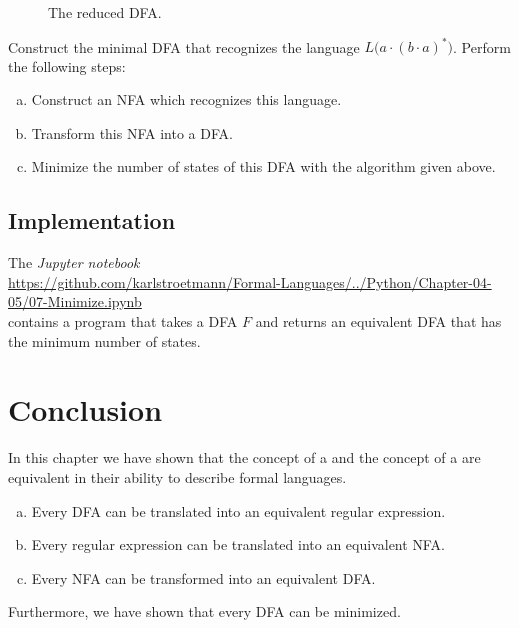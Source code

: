 \begin{figure}[!ht]
  \centering
   \caption{The reduced \textsc{DFA}.}
  \label{fig:gleichwertig.dot}
\end{figure}



\exerciseEng
Construct the minimal  \textsc{DFA} that recognizes the language 
$L\bigl(a \cdot (b \cdot a)^*\bigr)$.  Perform the following steps:
\begin{enumerate}[(a)]
\item Construct an \textsc{NFA} which recognizes this language.
\item Transform this \textsc{NFA} into a  \textsc{DFA}.
\item Minimize the number of states of this \textsc{DFA} with the algorithm given above.
\end{enumerate}

\subsection{Implementation}
The \textsl{Jupyter notebook} 
\\[0.2cm]
\hspace*{0.3cm}
\href{https://github.com/karlstroetmann/Formal-Languages/blob/master/Python/Chapter-04-05/07-Minimize.ipynb}{https://github.com/karlstroetmann/Formal-Languages/../Python/Chapter-04-05/07-Minimize.ipynb}
\\[0.2cm]
contains a program that takes a  \textsc{DFA} $F$ and returns an equivalent \textsc{DFA} that has
the minimum number of states.


\section{Conclusion}
In this chapter we have shown that the concept of a 
and the concept of a  are equivalent in their ability to describe formal languages.
\begin{enumerate}[(a)]
\item Every \textsc{DFA} can be translated into an equivalent regular expression.
\item Every regular expression can be translated into an equivalent \textsc{NFA}.
\item Every \textsc{NFA} can be transformed into an equivalent \textsc{DFA}.
\end{enumerate}
Furthermore, we have shown that every \textsc{DFA} can be minimized.

